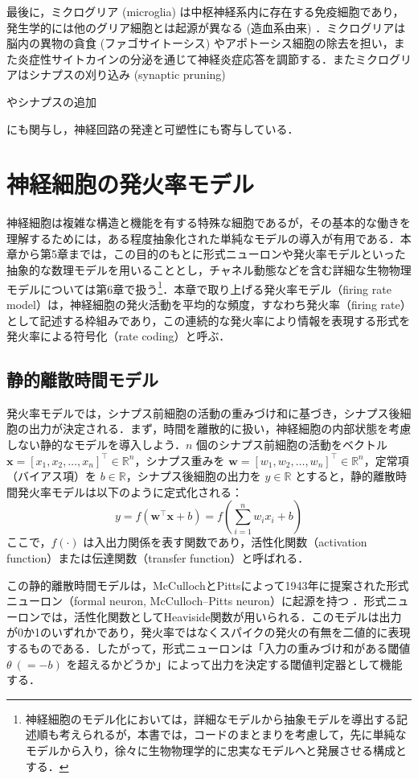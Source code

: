 \documentclass[titlepage]{ltjsbook}
\begin{document}
最後に，ミクログリア (microglia) は中枢神経系内に存在する免疫細胞であり，発生学的には他のグリア細胞とは起源が異なる (造血系由来) ．ミクログリアは脳内の異物の貪食 (ファゴサイトーシス) やアポトーシス細胞の除去を担い，また炎症性サイトカインの分泌を通じて神経炎症応答を調節する．またミクログリアはシナプスの刈り込み (synaptic pruning) 

やシナプスの追加

にも関与し，神経回路の発達と可塑性にも寄与している．

\section{神経細胞の発火率モデル}
神経細胞は複雑な構造と機能を有する特殊な細胞であるが，その基本的な働きを理解するためには，ある程度抽象化された単純なモデルの導入が有用である．本章から第5章までは，この目的のもとに形式ニューロンや発火率モデルといった抽象的な数理モデルを用いることとし，チャネル動態などを含む詳細な生物物理モデルについては第6章で扱う\footnote{神経細胞のモデル化においては，詳細なモデルから抽象モデルを導出する記述順も考えられるが，本書では，コードのまとまりを考慮して，先に単純なモデルから入り，徐々に生物物理学的に忠実なモデルへと発展させる構成とする．}．本章で取り上げる発火率モデル（firing rate model）は，神経細胞の発火活動を平均的な頻度，すなわち発火率（firing rate）として記述する枠組みであり，この連続的な発火率により情報を表現する形式を発火率による符号化（rate coding）と呼ぶ．

\subsection{静的離散時間モデル}
発火率モデルでは，シナプス前細胞の活動の重みづけ和に基づき，シナプス後細胞の出力が決定される．まず，時間を離散的に扱い，神経細胞の内部状態を考慮しない静的なモデルを導入しよう．$n$ 個のシナプス前細胞の活動をベクトル $\mathbf{x} = [x_1, x_2, \dots, x_n]^\top \in \mathbb{R}^n$，シナプス重みを $\mathbf{w} = [w_1, w_2, \dots, w_n]^\top \in \mathbb{R}^n$，定常項（バイアス項）を $b \in \mathbb{R}$，シナプス後細胞の出力を $y \in \mathbb{R}$ とすると，静的離散時間発火率モデルは以下のように定式化される：
\begin{equation}
y = f(\mathbf{w}^\top \mathbf{x} + b) = f\left(\sum_{i=1}^n w_i x_i + b\right)
\end{equation}
ここで，$f(\cdot)$ は入出力関係を表す関数であり，活性化関数（activation function）または伝達関数（transfer function）と呼ばれる．

この静的離散時間モデルは，McCullochとPittsによって1943年に提案された形式ニューロン（formal neuron, McCulloch–Pitts neuron）に起源を持つ \citep{mcculloch1943logical}．形式ニューロンでは，活性化関数としてHeaviside関数が用いられる．このモデルは出力が0か1のいずれかであり，発火率ではなくスパイクの発火の有無を二値的に表現するものである．したがって，形式ニューロンは「入力の重みづけ和がある閾値 $\theta \ (=-b)$ を超えるかどうか」によって出力を決定する閾値判定器として機能する．
\end{document}
